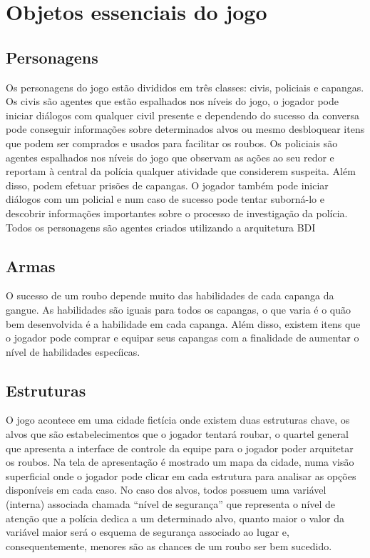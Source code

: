 \section{Objetos essenciais do jogo}

\subsection{Personagens}
Os personagens do jogo estão divididos em três classes: civis, policiais e capangas.
Os civis são agentes que estão espalhados nos níveis do jogo, o jogador pode iniciar diálogos com qualquer civil presente e dependendo do sucesso da conversa pode conseguir informações sobre determinados alvos ou mesmo desbloquear itens que podem ser comprados e usados para facilitar os roubos.
Os policiais são agentes espalhados nos níveis do jogo que observam as ações ao seu redor e reportam à central da polícia qualquer atividade que considerem suspeita. Além disso, podem efetuar prisões de capangas. O jogador também pode iniciar diálogos com um policial e num caso de sucesso pode tentar suborná-lo e descobrir informações importantes sobre o processo de investigação da polícia.
Todos os personagens são agentes criados utilizando a arquitetura BDI

\subsection{Armas}
O sucesso de um roubo depende muito das habilidades de cada capanga da gangue. As habilidades são iguais para todos os capangas, o que varia é o quão bem desenvolvida é a habilidade em cada capanga. Além disso, existem itens que o jogador pode comprar e equipar seus capangas com a finalidade de aumentar o nível de habilidades especíicas.

\subsection{Estruturas}
O jogo acontece em uma cidade fictícia onde existem duas estruturas chave, os alvos que são estabelecimentos que o jogador tentará roubar, o quartel general que apresenta a interface de controle da equipe para o jogador poder arquitetar os roubos.
Na tela de apresentação é mostrado um mapa da cidade, numa visão superficial onde o jogador pode clicar em cada estrutura para analisar as opções disponíveis em cada caso.
No caso dos alvos, todos possuem uma variável (interna) associada chamada ``nível de segurança'' que representa o nível de atenção que a polícia dedica a um determinado alvo, quanto maior o valor da variável maior será o esquema de segurança associado ao lugar e, consequentemente, menores são as chances de um roubo ser bem sucedido.

